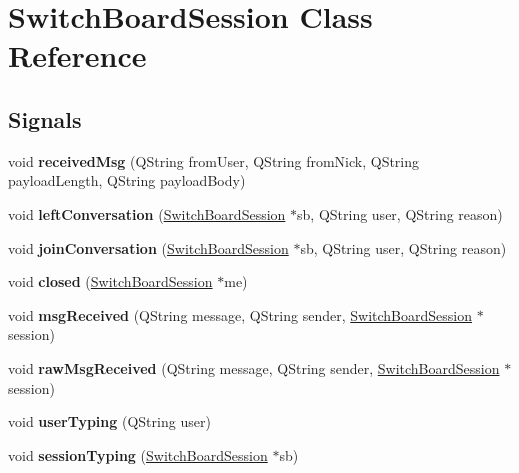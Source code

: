 \hypertarget{classSwitchBoardSession}{
\section{SwitchBoardSession Class Reference}
\label{classSwitchBoardSession}
}
\subsection*{Signals}
\begin{DoxyCompactItemize}
\item 
\hypertarget{classSwitchBoardSession_ac75df6142c80d4bfb174e88647aedc8e}{
void {\bfseries receivedMsg} (QString fromUser, QString fromNick, QString payloadLength, QString payloadBody)}
\label{classSwitchBoardSession_ac75df6142c80d4bfb174e88647aedc8e}

\item 
\hypertarget{classSwitchBoardSession_a0dceadd5add55c20c5e7c2f7e50dc643}{
void {\bfseries leftConversation} (\hyperlink{classSwitchBoardSession}{SwitchBoardSession} $\ast$sb, QString user, QString reason)}
\label{classSwitchBoardSession_a0dceadd5add55c20c5e7c2f7e50dc643}

\item 
\hypertarget{classSwitchBoardSession_a96070e15ac93e28979db4b117836b257}{
void {\bfseries joinConversation} (\hyperlink{classSwitchBoardSession}{SwitchBoardSession} $\ast$sb, QString user, QString reason)}
\label{classSwitchBoardSession_a96070e15ac93e28979db4b117836b257}

\item 
\hypertarget{classSwitchBoardSession_a6b97071275dc16e5943683ad891a9f24}{
void {\bfseries closed} (\hyperlink{classSwitchBoardSession}{SwitchBoardSession} $\ast$me)}
\label{classSwitchBoardSession_a6b97071275dc16e5943683ad891a9f24}

\item 
\hypertarget{classSwitchBoardSession_accc8ca9cb1c11b3aa2757f5a42fe9273}{
void {\bfseries msgReceived} (QString message, QString sender, \hyperlink{classSwitchBoardSession}{SwitchBoardSession} $\ast$session)}
\label{classSwitchBoardSession_accc8ca9cb1c11b3aa2757f5a42fe9273}

\item 
\hypertarget{classSwitchBoardSession_a5e905afb24ad7932e8bdd024ee452f16}{
void {\bfseries rawMsgReceived} (QString message, QString sender, \hyperlink{classSwitchBoardSession}{SwitchBoardSession} $\ast$session)}
\label{classSwitchBoardSession_a5e905afb24ad7932e8bdd024ee452f16}

\item 
\hypertarget{classSwitchBoardSession_a31c5d704ce939c36a5f5466e33d971c6}{
void {\bfseries userTyping} (QString user)}
\label{classSwitchBoardSession_a31c5d704ce939c36a5f5466e33d971c6}

\item 
\hypertarget{classSwitchBoardSession_a7b540933b18c17204f18e8b227402351}{
void {\bfseries sessionTyping} (\hyperlink{classSwitchBoardSession}{SwitchBoardSession} $\ast$sb)}
\label{classSwitchBoardSession_a7b540933b18c17204f18e8b227402351}

\end{DoxyCompactItemize}
